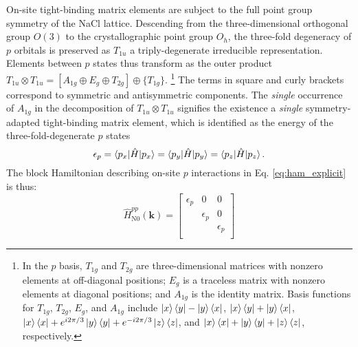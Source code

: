 \documentclass[twocolumn,showpacs,preprintnumbers,superscriptaddress,prb,floatfix,aps,10pt]{revtex4-1}
\renewcommand{\vec}[1]{\ensuremath{\mathbf{#1}}}
\newcommand*{\ham}{\hat{H}}
\begin{document}
On-site tight-binding matrix elements are subject to the full point group symmetry of the NaCl lattice. Descending from the three-dimensional orthogonal group $O(3)$ to the crystallographic point group $O_h$, the three-fold degeneracy of $p$ orbitals is preserved as $T_{1u}$ a triply-degenerate irreducible representation. Elements between $p$ states thus transform as the outer product $T_{1u} \otimes T_{1u} = [A_{1g} \oplus E_g \oplus T_{2g}] \oplus \{T_{1g}\}$. \footnote{ In the $p$ basis, $T_{1g}$ and $T_{2g}$ are three-dimensional matrices with nonzero elements at off-diagonal positions; $E_g$ is a traceless matrix with nonzero elements at diagonal positions; and $A_{1g}$ is the identity matrix. Basis functions for $T_{1g}$, $T_{2g}$, $E_g$, and $A_{1g}$ include $\ket{x}\bra{y} - \ket{y}\bra{x}$, $\ket{x}\bra{y} + \ket{y}\bra{x}$, $\ket{x}\bra{x} + e^{i2\pi/3}\ket{y}\bra{y} + e^{-i2\pi/3}\ket{z}\bra{z}$, and $\ket{x}\bra{x} + \ket{y}\bra{y} + \ket{z}\bra{z}$, respectively.} The terms in square and curly brackets correspond to symmetric and antisymmetric components. The \emph{single} occurrence of $A_{1g}$ in the decomposition of $T_{1u} \otimes T_{1u}$ signifies the existence a \emph{single} symmetry-adapted tight-binding matrix element, which is identified as the energy of the three-fold-degenerate $p$ states
%
\begin{equation}
\epsilon_{p}
= \braket{p_x | \ham | p_x} 
= \braket{p_y | \ham | p_y} 
= \braket{p_z | \ham | p_z} .
\end{equation}
%
The block Hamiltonian describing on-site $p$ interactions in Eq. \ref{eq:ham_explicit} is thus:
%
\begin{equation}
\label{eq:0pp}
\ham_{\textrm{N0}}^{pp}(\vec{k}) =
\begin{bmatrix}
\epsilon_{p} & 0 & 0 \\
  & \epsilon_{p} & 0 \\
  &   & \epsilon_{p} \\
\end{bmatrix}
\end{equation}
\end{document}
